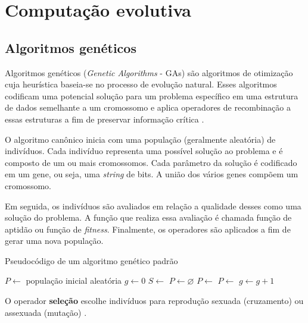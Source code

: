 \section{Computação evolutiva}
\label{sec:evolutionary-computation}

\subsection{Algoritmos genéticos}

Algoritmos genéticos (\textit{Genetic Algorithms} - GAs) são algoritmos de otimização cuja heurística baseia-se no processo de evolução natural. Esses algoritmos codificam uma potencial solução para um problema específico em uma estrutura de dados semelhante a um cromossomo e aplica operadores de recombinação a essas estruturas a fim de preservar informação crítica \cite{whitley1994genetic}.

O algoritmo canônico inicia com uma população (geralmente aleatória) de indivíduos. Cada indivíduo representa uma possível solução ao problema e é composto de um ou mais cromossomos. Cada parâmetro da solução é codificado em um gene, ou seja, uma \textit{string} de bits. A união dos vários genes compõem um cromossomo.

Em seguida, os indivíduos são avaliados em relação a qualidade desses como uma solução do problema. A função que realiza essa avaliação é chamada função de aptidão ou função de \textit{fitness}. Finalmente, os operadores são aplicados a fim de gerar uma nova população.

\begin{algorithm}[h]
    \caption{Pseudocódigo de um algoritmo genético padrão}
    \begin{algorithmic}
        \State $P \gets $ população inicial aleatória
        \State $g \gets 0$
            \State {}
            \State $S \gets$ 
            \State $P \gets \varnothing$
                \State $P \gets$ 
            \EndFor
            \State $P \gets $ 
            \State $g \gets g + 1$
        \EndWhile
    \end{algorithmic}
\end{algorithm}

O operador \textbf{seleção} escolhe indivíduos para reprodução sexuada (cruzamento) ou assexuada (mutação) \cite{erik2012geneticos}.

